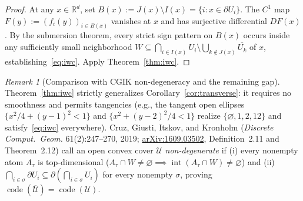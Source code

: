 \documentclass[11pt]{article}
\theoremstyle{plain}
\theoremstyle{definition}
\theoremstyle{remark}
\newtheorem{remark}{Remark}
\DeclareMathOperator{\code}{code}
\DeclareMathOperator{\interior}{int}
\begin{document}
\begin{proof}
At any $x \in \mathbb{R}^d$, set $B(x) := J(x) \setminus I(x) = \{i : x \in \partial U_i\}$. The $C^1$ map $F(y) := (f_i(y))_{i \in B(x)}$ vanishes at $x$ and has surjective differential $DF(x)$. By the submersion theorem, every strict sign pattern on $B(x)$ occurs inside any sufficiently small neighborhood $W \subseteq \bigcap_{i \in I(x)} U_i \setminus \bigcup_{k \notin J(x)} \overline{U_k}$ of $x$, establishing~\eqref{eq:iwc}. Apply Theorem~\ref{thm:iwc}.
\end{proof}

\begin{remark}[Comparison with CGIK non-degeneracy and the remaining gap]
Theorem~\ref{thm:iwc} strictly generalizes Corollary~\ref{cor:transverse}: it requires no smoothness and permits tangencies (e.g., the tangent open ellipses $\{x^2/4 + (y-1)^2 < 1\}$ and $\{x^2 + (y-2)^2/4 < 1\}$ realize $\{\varnothing, 1, 2, 12\}$ and satisfy~\eqref{eq:iwc} everywhere).
Cruz, Giusti, Itskov, and Kronholm (\emph{Discrete Comput.\ Geom.} 61(2):247--270, 2019; \href{https://arxiv.org/abs/1609.03502}{arXiv:1609.03502}, Definition~2.11 and Theorem~2.12) call an open convex cover $\mathcal{U}$ \emph{non-degenerate} if (i) every nonempty atom $A_\tau$ is top-dimensional ($A_\tau \cap W \neq \varnothing \implies \interior(A_\tau \cap W) \neq \varnothing$) and (ii) $\bigcap_{i \in \sigma} \partial U_i \subseteq \partial(\bigcap_{i \in \sigma} U_i)$ for every nonempty $\sigma$, proving $\code(\overline{\mathcal{U}}) = \code(\mathcal{U})$.


\end{remark}
\end{document}

